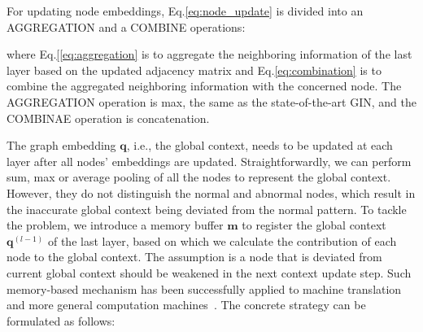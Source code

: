 {%







For updating node embeddings, Eq.\eqref{eq:node_update} is divided into an AGGREGATION and a COMBINE operations:

\beqn{
	\label{[eq:aggregation}
	\boldsymbol{a}_i^{(l)} &=& \text{AGGREGATION}(\{\boldsymbol{h}_{j}^{(l-1)}: A_{ij}^{(l)} = 1\}), \\
	\label{eq:combination}
	\boldsymbol{h}_{i}^{(l)} &=& \text{COMBINE}(\boldsymbol{h}_i^{(l-1)}, \boldsymbol{a}_i^{(l)}),
}

\noindent where Eq.\eqref{[eq:aggregation} is to aggregate the neighboring information of the last layer based on the updated adjacency matrix and Eq.\eqref{eq:combination} is to combine the aggregated neighboring information with the concerned node. The AGGREGATION operation is max, the same as the state-of-the-art GIN, and the COMBINAE operation is concatenation. 


The graph embedding $\boldsymbol{q}$, i.e., the global context, needs to be updated at each layer after all nodes' embeddings are updated. Straightforwardly, we can perform sum, max or average pooling of all the nodes to represent the global context. However, they do not distinguish the normal and abnormal nodes, which result in the inaccurate global context being deviated from the normal pattern. To tackle the problem, we introduce a memory buffer $\boldsymbol{m}$ to register the global context $\boldsymbol{q}^{(l-1)}$ of the last layer, based on which we calculate the contribution of each node to the global context. The assumption is a node that is deviated from current global context should be weakened in the next context update step. Such memory-based mechanism has been successfully applied to machine translation~\cite{vinyals2015order, bahdanau2015neural} and more general computation machines~\cite{weston2014memory, graves2014neural}. The concrete strategy can be formulated as follows:

}
